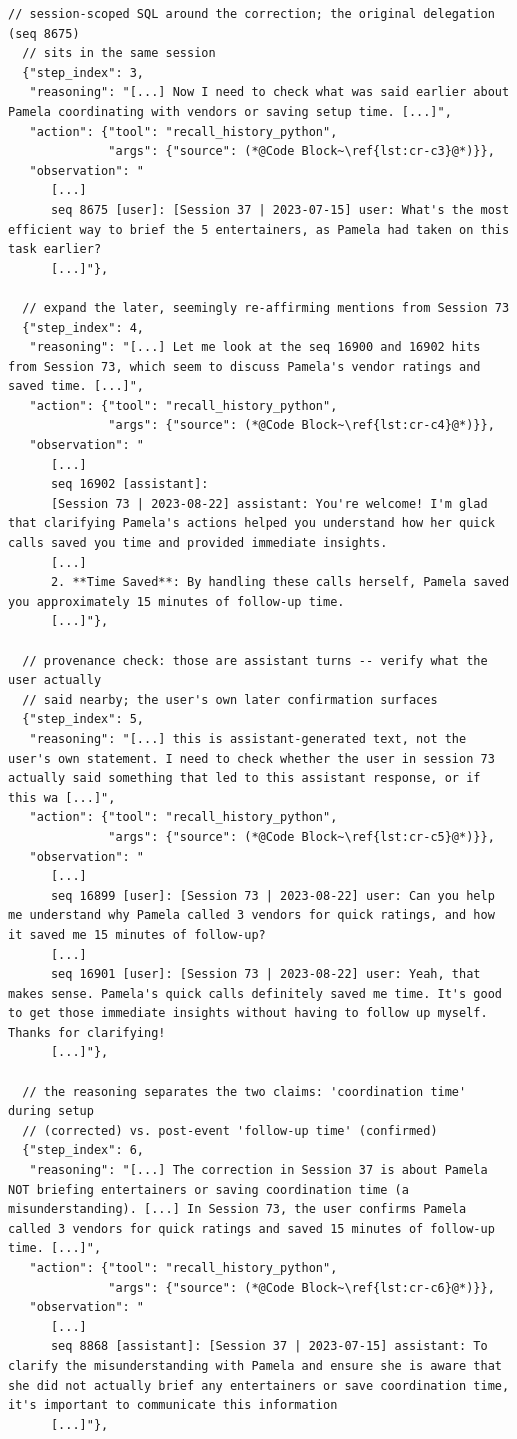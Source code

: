\begin{lstlisting}[style=traj]
  // session-scoped SQL around the correction; the original delegation (seq 8675) 
  // sits in the same session
  {"step_index": 3,
   "reasoning": "[...] Now I need to check what was said earlier about Pamela coordinating with vendors or saving setup time. [...]",
   "action": {"tool": "recall_history_python",
              "args": {"source": (*@Code Block~\ref{lst:cr-c3}@*)}},
   "observation": "
      [...]
      seq 8675 [user]: [Session 37 | 2023-07-15] user: What's the most efficient way to brief the 5 entertainers, as Pamela had taken on this task earlier?
      [...]"},

  // expand the later, seemingly re-affirming mentions from Session 73
  {"step_index": 4,
   "reasoning": "[...] Let me look at the seq 16900 and 16902 hits from Session 73, which seem to discuss Pamela's vendor ratings and saved time. [...]",
   "action": {"tool": "recall_history_python",
              "args": {"source": (*@Code Block~\ref{lst:cr-c4}@*)}},
   "observation": "
      [...]
      seq 16902 [assistant]:
      [Session 73 | 2023-08-22] assistant: You're welcome! I'm glad that clarifying Pamela's actions helped you understand how her quick calls saved you time and provided immediate insights.
      [...]
      2. **Time Saved**: By handling these calls herself, Pamela saved you approximately 15 minutes of follow-up time.
      [...]"},

  // provenance check: those are assistant turns -- verify what the user actually
  // said nearby; the user's own later confirmation surfaces
  {"step_index": 5,
   "reasoning": "[...] this is assistant-generated text, not the user's own statement. I need to check whether the user in session 73 actually said something that led to this assistant response, or if this wa [...]",
   "action": {"tool": "recall_history_python",
              "args": {"source": (*@Code Block~\ref{lst:cr-c5}@*)}},
   "observation": "
      [...]
      seq 16899 [user]: [Session 73 | 2023-08-22] user: Can you help me understand why Pamela called 3 vendors for quick ratings, and how it saved me 15 minutes of follow-up?
      [...]
      seq 16901 [user]: [Session 73 | 2023-08-22] user: Yeah, that makes sense. Pamela's quick calls definitely saved me time. It's good to get those immediate insights without having to follow up myself. Thanks for clarifying!
      [...]"},

  // the reasoning separates the two claims: 'coordination time' during setup 
  // (corrected) vs. post-event 'follow-up time' (confirmed)
  {"step_index": 6,
   "reasoning": "[...] The correction in Session 37 is about Pamela NOT briefing entertainers or saving coordination time (a misunderstanding). [...] In Session 73, the user confirms Pamela called 3 vendors for quick ratings and saved 15 minutes of follow-up time. [...]",
   "action": {"tool": "recall_history_python",
              "args": {"source": (*@Code Block~\ref{lst:cr-c6}@*)}},
   "observation": "
      [...]
      seq 8868 [assistant]: [Session 37 | 2023-07-15] assistant: To clarify the misunderstanding with Pamela and ensure she is aware that she did not actually brief any entertainers or save coordination time, it's important to communicate this information
      [...]"},


\end{lstlisting}
